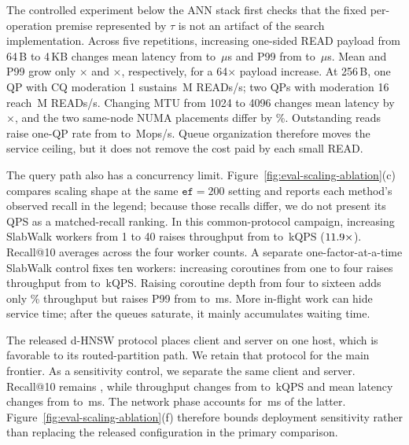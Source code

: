 \documentclass[sigconf,nonacm]{acmart}
\newcommand{\sys}{SlabWalk}
\newcommand{\ef}{\texttt{ef}}
\begin{document}
The controlled experiment below the ANN stack first checks that the fixed
per-operation premise represented by $\tau$ is not an artifact of the search
implementation.  Across five repetitions, increasing
one-sided READ payload from 64\,B to 4\,KB changes mean latency from
\ClaimRdmaPayloadSmallMeanUs{} to \ClaimRdmaPayloadLargeMeanUs{}\,$\mu$s and
P99 from \ClaimRdmaPayloadSmallTailUs{} to
\ClaimRdmaPayloadLargeTailUs{}\,$\mu$s.  Mean and P99 grow only
\ClaimRdmaPayloadMeanSpan$\times$ and
\ClaimRdmaPayloadTailSpan$\times$, respectively, for a 64$\times$ payload
increase.  At 256\,B, one QP with CQ moderation 1 sustains
\ClaimRdmaQpOneMops\,M READs/s; two QPs with moderation 16 reach
\ClaimRdmaQpTwoMops\,M READs/s.  Changing MTU from 1024 to 4096 changes mean
latency by \ClaimRdmaMtuMeanSpan$\times$, and the two same-node NUMA
placements differ by \ClaimRdmaNumaDiffPct\%.  Outstanding reads raise
one-QP rate from \ClaimRdmaOutsOneMops{} to
\ClaimRdmaOutsSixteenMops\,Mops/s.  Queue organization therefore
moves the service ceiling, but it does not remove the cost paid by each small
READ.

The query path also has a concurrency limit.
Figure~\ref{fig:eval-scaling-ablation}(c) compares scaling shape at the same
$\ef{=}200$ setting and reports each method's observed recall in the legend;
because those recalls differ, we do not present its QPS as a matched-recall
ranking.  In this common-protocol campaign, increasing \sys{} workers from 1
to 40 raises throughput from \ClaimWorkerOneKqps{} to
\ClaimWorkerFortyKqps{}\,kQPS ($11.9\times$).  Recall@10 averages
\ClaimWorkerRecall{} across the four worker counts.  A separate
one-factor-at-a-time \sys{} control fixes ten
workers: increasing coroutines from one to four raises throughput from
\ClaimCoroOneKqps{} to \ClaimCoroFourKqps\,kQPS\@.  Raising coroutine depth
from four to sixteen adds only \ClaimCoroFourToSixteenGainPct\% throughput but
raises P99 from \ClaimCoroFourTailMs{} to
\ClaimCoroSixteenTailMs\,ms.  More in-flight work can hide service time; after
the queues saturate, it mainly accumulates waiting time.

The released d-HNSW protocol places client and server on one host, which is
favorable to its routed-partition path.  We retain that protocol for the main
frontier.  As a sensitivity control, we separate the same client and server.
Recall@10 remains \ClaimTopologyRecall{}, while throughput changes from
\ClaimTopologyLoopbackKqps{} to \ClaimTopologyRemoteKqps\,kQPS and mean
latency changes from \ClaimTopologyLoopbackLatencyMs{} to
\ClaimTopologyRemoteLatencyMs\,ms.  The network phase accounts for
\ClaimTopologyRemoteNetworkMs\,ms of the latter.
Figure~\ref{fig:eval-scaling-ablation}(f)
therefore bounds deployment sensitivity rather than replacing the released
configuration in the primary comparison.
\end{document}
